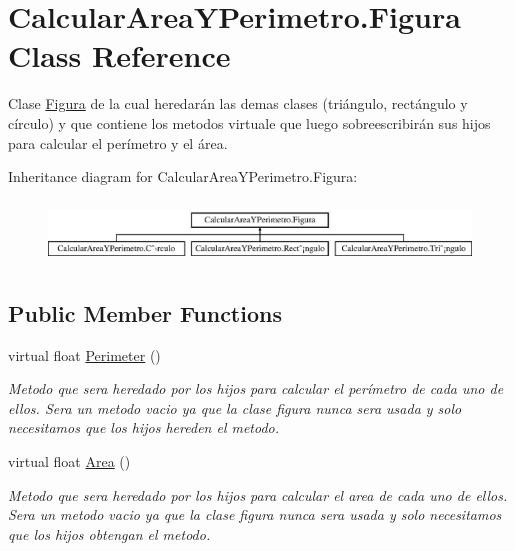 \hypertarget{class_calcular_area_y_perimetro_1_1_figura}{}\section{Calcular\+Area\+Y\+Perimetro.\+Figura Class Reference}
\label{class_calcular_area_y_perimetro_1_1_figura}


Clase \hyperlink{class_calcular_area_y_perimetro_1_1_figura}{Figura} de la cual heredarán las demas clases (triángulo, rectángulo y círculo) y que contiene los metodos virtuale que luego sobreescribirán sus hijos para calcular el perímetro y el área.  


Inheritance diagram for Calcular\+Area\+Y\+Perimetro.\+Figura\+:\begin{figure}[H]
\begin{center}
\leavevmode
\includegraphics[height=1.696970cm]{class_calcular_area_y_perimetro_1_1_figura}
\end{center}
\end{figure}
\subsection*{Public Member Functions}
\begin{DoxyCompactItemize}
\item 
virtual float \hyperlink{class_calcular_area_y_perimetro_1_1_figura_a501d20cb8d81cdbb12e0dadc48ba2f87}{Perimeter} ()
\begin{DoxyCompactList}\small\item\em Metodo que sera heredado por los hijos para calcular el perímetro de cada uno de ellos. Sera un metodo vacio ya que la clase figura nunca sera usada y solo necesitamos que los hijos hereden el metodo. \end{DoxyCompactList}\item 
virtual float \hyperlink{class_calcular_area_y_perimetro_1_1_figura_a283e25acf28cd02036270291bdfa99fb}{Area} ()
\begin{DoxyCompactList}\small\item\em Metodo que sera heredado por los hijos para calcular el area de cada uno de ellos. Sera un metodo vacio ya que la clase figura nunca sera usada y solo necesitamos que los hijos obtengan el metodo. \end{DoxyCompactList}\end{DoxyCompactItemize}


